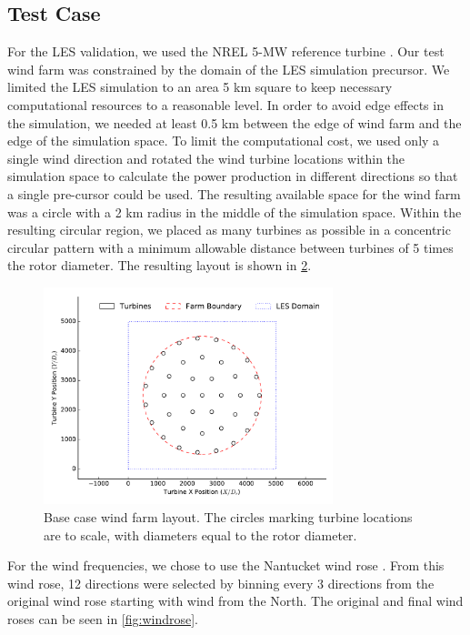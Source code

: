 \documentclass[conf]{new-aiaa}
\begin{document}
{\begin{figure}[ht]
	\label{fig:power_direction}
\end{figure}

\subsection{Test Case}

For the LES validation, we used the NREL 5-MW reference turbine \cite{jonkman2009}. Our test wind farm was constrained by the domain of the LES simulation precursor. We limited the LES simulation to an area 5 km square to keep necessary computational resources to a reasonable level. In order to avoid edge effects in the simulation, we needed at least 0.5 km between the edge of wind farm and the edge of the simulation space. To limit the computational cost, we used only a single wind direction and rotated the wind turbine locations within the simulation space to calculate the power production in different directions so that a single pre-cursor could be used. The resulting available space for the wind farm was a circle with a 2 km radius in the middle of the simulation space. Within the resulting circular region, we placed as many turbines as possible in a concentric circular pattern with a minimum allowable distance between turbines of 5 times the rotor diameter. The resulting layout is shown in \cref{fig:starting-layout}.    

\begin{figure}[ht]
	\centering
	\includegraphics[width=0.75\textwidth]{final_images/round_farm_38Turbines_5DSpacing.pdf}
	\caption{Base case wind farm layout. The circles marking turbine locations are to scale, with diameters equal to the rotor diameter.}
	\label{fig:starting-layout}
\end{figure}

For the wind frequencies, we chose to use the Nantucket wind rose \cite{wrcc2017} %
. From this wind rose, 12 directions were selected by binning every 3 directions from the original wind rose starting with wind from the North. The original and final wind roses can be seen in \cref{fig:windrose}.

}
\end{document}

